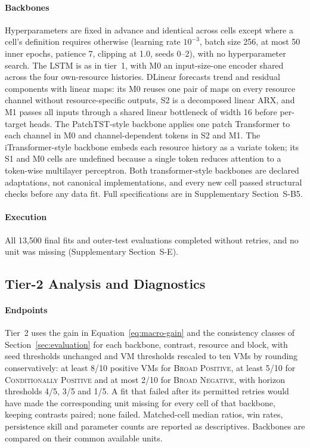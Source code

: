\documentclass[5p,twocolumn]{elsarticle}
\begin{document}
\paragraph{Backbones} Hyperparameters are fixed in advance and identical
across cells except where a cell's definition requires otherwise (learning
rate $10^{-3}$, batch size 256, at most 50 inner epochs, patience 7, clipping
at 1.0, seeds 0--2), with no hyperparameter search. The LSTM is as in tier~1,
with M0 an input-size-one encoder shared across the four own-resource
histories. DLinear \citep{Zeng2023DLinear} forecasts trend and residual
components with linear maps: its M0 reuses one pair of maps on every
resource channel without resource-specific outputs, S2 is a decomposed linear
ARX, and M1 passes all inputs through a shared linear bottleneck of width 16
before per-target heads. The PatchTST-style backbone \citep{Nie2023PatchTST}
applies one patch Transformer to each channel in M0 and channel-dependent
tokens in S2 and M1. The iTransformer-style backbone
\citep{Liu2024iTransformer} embeds each resource history as a variate token;
its S1 and M0 cells are undefined because a single token reduces attention to
a token-wise multilayer perceptron. Both transformer-style backbones are
declared adaptations, not canonical implementations, and every new cell
passed structural checks before any data fit. Full specifications are in
Supplementary Section~S-B5.

\paragraph{Execution} All 13{,}500 final fits and outer-test evaluations
completed without retries, and no unit was missing (Supplementary
Section~S-E).

\subsection{Tier-2 Analysis and Diagnostics}
\label{sec:tier2-analysis}

\paragraph{Endpoints} Tier~2 uses the gain in
Equation~\ref{eq:macro-gain} and the consistency classes of
Section~\ref{sec:evaluation} for each backbone, contrast, resource and
block, with seed thresholds unchanged and VM thresholds rescaled to ten VMs
by rounding conservatively: at least 8/10 positive VMs for
\textsc{Broad Positive}, at least 5/10 for \textsc{Conditionally Positive}
and at most 2/10 for \textsc{Broad Negative}, with horizon thresholds 4/5,
3/5 and 1/5. A fit that failed after its permitted retries would have made
the corresponding unit missing for every cell of that backbone, keeping
contrasts paired; none failed. Matched-cell median ratios, win rates,
persistence skill and parameter counts are reported as descriptives.
Backbones are compared on their common available units.
\end{document}
